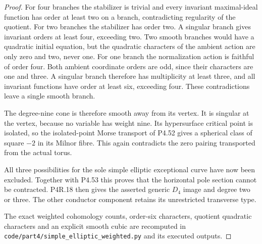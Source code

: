 \begin{proof}
For four branches the stabilizer is
trivial and every invariant maximal-ideal
function has order at least two on a
branch, contradicting regularity of the
quotient. For two branches the stabilizer
has order two. A singular branch gives
invariant orders at least four, exceeding
two. Two smooth branches would have a
quadratic initial equation, but the
quadratic characters of the ambient
action are only zero and two, never one.
For one branch the normalization action
is faithful of order four. Both ambient
coordinate orders are odd, since their
characters are one and three. A singular
branch therefore has multiplicity at
least three, and all invariant functions
have order at least six, exceeding four.
These contradictions leave a single
smooth branch.

The degree-nine cone is therefore smooth
away from its vertex. It is singular
at the vertex, because no variable has
weight nine. Its hypersurface critical
point is isolated, so the isolated-point
Morse transport of P4.52 gives a spherical
class of square $-2$ in its Milnor fibre.
This again contradicts the zero pairing
transported from the actual torus.

All three possibilities for the sole
simple elliptic exceptional curve have
now been excluded. Together with P4.53
this proves that the horizontal pole
section cannot be contracted. P4R.18
then gives the asserted generic $D_4$
image and degree two or three. The
other conductor component retains its
unrestricted transverse type.

The exact weighted cohomology counts,
order-six characters, quotient quadratic
characters and an explicit smooth cubic
are recomputed in
\texttt{code/part4/simple\_elliptic\_weighted.py}
and its executed outputs.

\end{proof}
